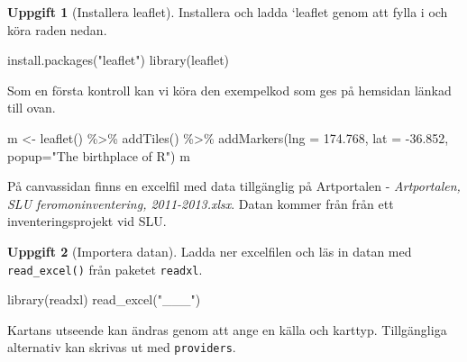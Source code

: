 \documentclass[
]{book}
\newenvironment{Shaded}{\begin{snugshade}}{\end{snugshade}}
\newcommand{\AttributeTok}[1]{\textcolor[rgb]{0.77,0.63,0.00}{#1}}
\newcommand{\FloatTok}[1]{\textcolor[rgb]{0.00,0.00,0.81}{#1}}
\newcommand{\FunctionTok}[1]{\textcolor[rgb]{0.00,0.00,0.00}{#1}}
\newcommand{\NormalTok}[1]{#1}
\newcommand{\OtherTok}[1]{\textcolor[rgb]{0.56,0.35,0.01}{#1}}
\newcommand{\SpecialCharTok}[1]{\textcolor[rgb]{0.00,0.00,0.00}{#1}}
\newcommand{\StringTok}[1]{\textcolor[rgb]{0.31,0.60,0.02}{#1}}
\theoremstyle{definition}
\theoremstyle{definition}
\theoremstyle{definition}
\newtheorem{exercise}{Uppgift}[chapter]
\theoremstyle{definition}
\theoremstyle{remark}
\begin{document}
\begin{exercise}[Installera leaflet]

Installera och ladda `leaflet genom att fylla i och köra raden nedan.

\begin{Shaded}
\begin{Highlighting}[]
\FunctionTok{install.packages}\NormalTok{(}\StringTok{"leaflet"}\NormalTok{)}
\FunctionTok{library}\NormalTok{(leaflet)}
\end{Highlighting}
\end{Shaded}

\end{exercise}

Som en första kontroll kan vi köra den exempelkod som ges på hemsidan länkad till ovan.

\begin{Shaded}
\begin{Highlighting}[]
\NormalTok{m }\OtherTok{\textless{}{-}} \FunctionTok{leaflet}\NormalTok{() }\SpecialCharTok{\%\textgreater{}\%}
  \FunctionTok{addTiles}\NormalTok{() }\SpecialCharTok{\%\textgreater{}\%}
  \FunctionTok{addMarkers}\NormalTok{(}\AttributeTok{lng =} \FloatTok{174.768}\NormalTok{, }\AttributeTok{lat =} \SpecialCharTok{{-}}\FloatTok{36.852}\NormalTok{, }\AttributeTok{popup=}\StringTok{"The birthplace of R"}\NormalTok{)}
\NormalTok{m}
\end{Highlighting}
\end{Shaded}

På canvassidan finns en excelfil med data tillgänglig på Artportalen - \emph{Artportalen, SLU feromoninventering, 2011-2013.xlsx}. Datan kommer från från ett inventeringsprojekt vid SLU.

\begin{exercise}[Importera datan]

Ladda ner excelfilen och läs in datan med \texttt{read\_excel()} från paketet \texttt{readxl}.

\begin{Shaded}
\begin{Highlighting}[]
\FunctionTok{library}\NormalTok{(readxl)}
\FunctionTok{read\_excel}\NormalTok{(}\StringTok{"\_\_\_"}\NormalTok{)}
\end{Highlighting}
\end{Shaded}

\end{exercise}

Kartans utseende kan ändras genom att ange en källa och karttyp. Tillgängliga alternativ kan skrivas ut med \texttt{providers}.
\end{document}
